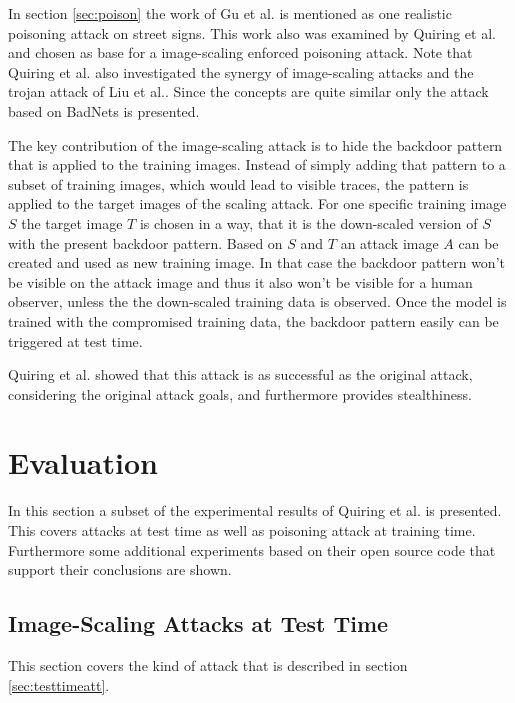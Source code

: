 \documentclass[sigconf]{acmart}
\begin{document}
In section \ref{sec:poison} the work of Gu et al.\cite{8685687} is mentioned as one realistic poisoning attack on street signs.
This work also was examined by Quiring et al. and chosen as base for a image-scaling enforced poisoning attack.
Note that Quiring et al. also investigated the synergy of image-scaling attacks and the trojan attack of Liu et al.\cite{trojanattack}.
Since the concepts are quite similar only the attack based on BadNets is presented.

The key contribution of the image-scaling attack is to hide the backdoor pattern that is applied to the training images.
Instead of simply adding that pattern to a subset of training images, which would lead to visible traces, the pattern is applied to the target images of the scaling attack.
For one specific training image $S$ the target image $T$ is chosen in a way, that it is the down-scaled version of $S$ with the present backdoor pattern.
Based on $S$ and $T$ an attack image $A$ can be created and used as new training image.
In that case the backdoor pattern won't be visible on the attack image and thus it also won't be visible for a human observer, unless the the down-scaled training data is observed.
Once the model is trained with the compromised training data, the backdoor pattern easily can be triggered at test time.

Quiring et al. showed that this attack is as successful as the original attack, considering the original attack goals, and furthermore provides stealthiness.

\section{Evaluation}
In this section a subset of the experimental results of Quiring et al.\cite{imgscale, imgscalepoison} is presented.
This covers attacks at test time as well as poisoning attack at training time.
Furthermore some additional experiments based on their open source code that support their conclusions are shown.

\subsection{Image-Scaling Attacks at Test Time}
This section covers the kind of attack that is described in section \ref{sec:testtimeatt}.
\end{document}
